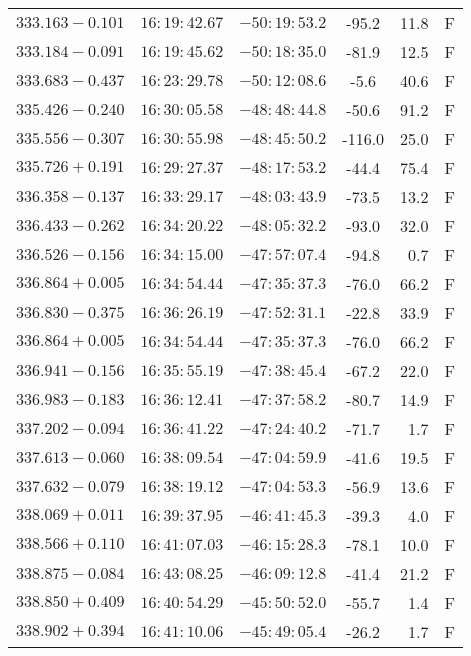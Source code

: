 {\begin{longtable}{lcccrc}
	$333.163-0.101  $&    $16:19:42.67$ &   $-50:19:53.2$  &  -95.2&   11.8&  F  \\
	$333.184-0.091  $&    $16:19:45.62$ &   $-50:18:35.0$  &  -81.9&   12.5&  F  \\
	$333.683-0.437  $&    $16:23:29.78$ &   $-50:12:08.6$  &   -5.6&   40.6&  F  \\
	$335.426-0.240  $&    $16:30:05.58$ &   $-48:48:44.8$  &  -50.6&   91.2&  F  \\
	$335.556-0.307  $&    $16:30:55.98$ &   $-48:45:50.2$  & -116.0&   25.0&  F  \\
	$335.726+0.191  $&    $16:29:27.37$ &   $-48:17:53.2$  &  -44.4&   75.4&  F  \\
	$336.358-0.137  $&    $16:33:29.17$ &   $-48:03:43.9$  &  -73.5&   13.2&  F  \\
	$336.433-0.262  $&    $16:34:20.22$ &   $-48:05:32.2$  &  -93.0&   32.0&  F  \\
	$336.526-0.156  $&    $16:34:15.00$ &   $-47:57:07.4$  &  -94.8&    0.7&  F  \\
	$336.864+0.005  $&    $16:34:54.44$ &   $-47:35:37.3$  &  -76.0&   66.2&  F  \\
	$336.830-0.375  $&    $16:36:26.19$ &   $-47:52:31.1$  &  -22.8&   33.9&  F  \\
	$336.864+0.005  $&    $16:34:54.44$ &   $-47:35:37.3$  &  -76.0&   66.2&  F  \\
	$336.941-0.156  $&    $16:35:55.19$ &   $-47:38:45.4$  &  -67.2&   22.0&  F  \\
	$336.983-0.183  $&    $16:36:12.41$ &   $-47:37:58.2$  &  -80.7&   14.9&  F  \\
	$337.202-0.094  $&    $16:36:41.22$ &   $-47:24:40.2$  &  -71.7&    1.7&  F  \\
	$337.613-0.060  $&    $16:38:09.54$ &   $-47:04:59.9$  &  -41.6&   19.5&  F  \\
	$337.632-0.079  $&    $16:38:19.12$ &   $-47:04:53.3$  &  -56.9&   13.6&  F  \\
	$338.069+0.011  $&    $16:39:37.95$ &   $-46:41:45.3$  &  -39.3&    4.0&  F  \\
	$338.566+0.110  $&    $16:41:07.03$ &   $-46:15:28.3$  &  -78.1&   10.0&  F  \\
	$338.875-0.084  $&    $16:43:08.25$ &   $-46:09:12.8$  &  -41.4&   21.2&  F  \\
	$338.850+0.409  $&    $16:40:54.29$ &   $-45:50:52.0$  &  -55.7&    1.4&  F  \\
	$338.902+0.394  $&    $16:41:10.06$ &   $-45:49:05.4$  &  -26.2&    1.7&  F  \\

\end{longtable}}
